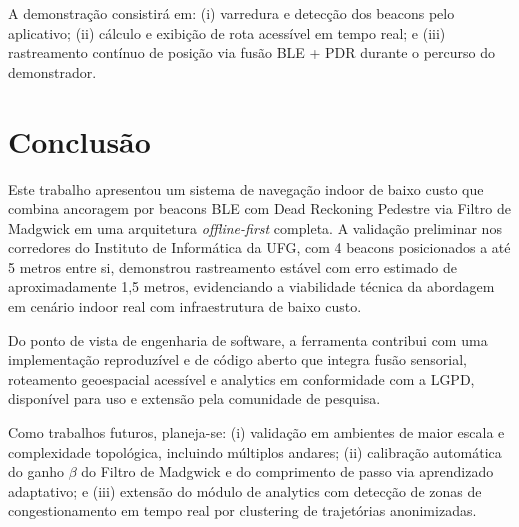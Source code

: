 \documentclass[12pt]{article}
\begin{document}
A demonstração consistirá em: (i) varredura e detecção dos beacons pelo aplicativo;
(ii) cálculo e exibição de rota acessível em tempo real; e (iii) rastreamento
contínuo de posição via fusão BLE + PDR durante o percurso do demonstrador.

\section{Conclusão}

Este trabalho apresentou um sistema de navegação indoor de baixo custo que combina
ancoragem por beacons BLE com Dead Reckoning Pedestre via Filtro de Madgwick em
uma arquitetura \textit{offline-first} completa. A validação preliminar nos corredores
do Instituto de Informática da UFG, com 4 beacons posicionados a até 5 metros entre
si, demonstrou rastreamento estável com erro estimado de aproximadamente 1,5 metros,
evidenciando a viabilidade técnica da abordagem em cenário indoor real com
infraestrutura de baixo custo.

Do ponto de vista de engenharia de software, a ferramenta contribui com uma
implementação reproduzível e de código aberto que integra fusão sensorial, roteamento
geoespacial acessível e analytics em conformidade com a LGPD, disponível para
uso e extensão pela comunidade de pesquisa.

Como trabalhos futuros, planeja-se: (i) validação em ambientes de maior escala e
complexidade topológica, incluindo múltiplos andares; (ii) calibração automática
do ganho $\beta$ do Filtro de Madgwick e do comprimento de passo via aprendizado
adaptativo; e (iii) extensão do módulo de analytics com detecção de zonas de
congestionamento em tempo real por clustering de trajetórias anonimizadas.
\end{document}
